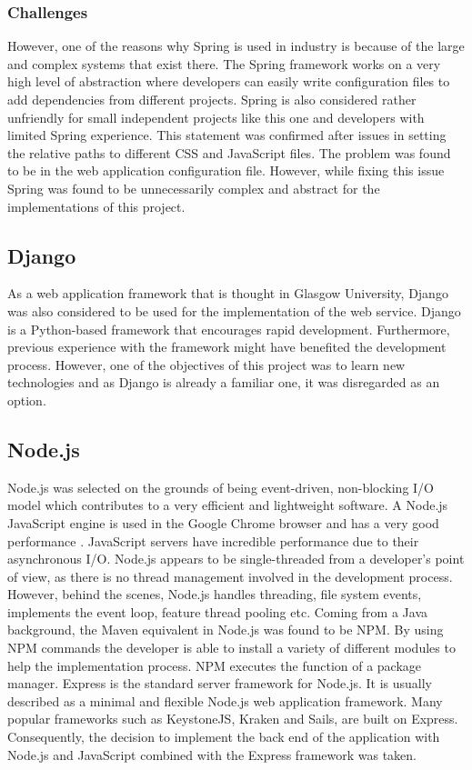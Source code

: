 \documentclass{l4proj}
\begin{document}
\subsubsection{Challenges}

However, one of the reasons why Spring is used in industry is because of the large and complex systems that exist there. The Spring framework works on a very high level of abstraction where developers can easily write configuration files to add dependencies from different projects. Spring is also considered rather unfriendly for small independent projects like this one and developers with limited Spring experience. This statement was confirmed after issues in setting the relative paths to different CSS and JavaScript files. The problem was found to be in the web application configuration file. However, while fixing this issue Spring was found to be unnecessarily complex and abstract for the implementations of this project.

\subsection{Django}

As a web application framework that is thought in Glasgow University, Django was also considered to be used for the implementation of the web service. Django is a Python-based framework that encourages rapid development. Furthermore, previous experience with the framework might have benefited the development process. However, one of the objectives of this project was to learn new technologies and as Django is already a familiar one, it was disregarded as an option.

\subsection{Node.js}

Node.js was selected on the grounds of being event-driven, non-blocking I/O model which contributes to a very efficient and lightweight software. A Node.js JavaScript engine is used in the Google Chrome browser and has a very good performance \cite{tilkov2010node}. JavaScript servers have incredible performance due to their asynchronous I/O. Node.js appears to be single-threaded from a developer's point of view, as there is no thread management involved in the development process. However, behind the scenes, Node.js handles threading, file system events, implements the event loop, feature thread pooling etc. Coming from a Java background, the Maven equivalent in Node.js was found to be NPM. By using NPM commands the developer is able to install a variety of different modules to help the implementation process. NPM executes the function of a package manager. Express is the standard server framework for Node.js. It is usually described as a minimal and flexible Node.js web application framework. Many popular frameworks such as KeystoneJS, Kraken and Sails, are built on Express. Consequently, the decision to implement the back end of the application with Node.js and JavaScript combined with the Express framework was taken.
\end{document}
